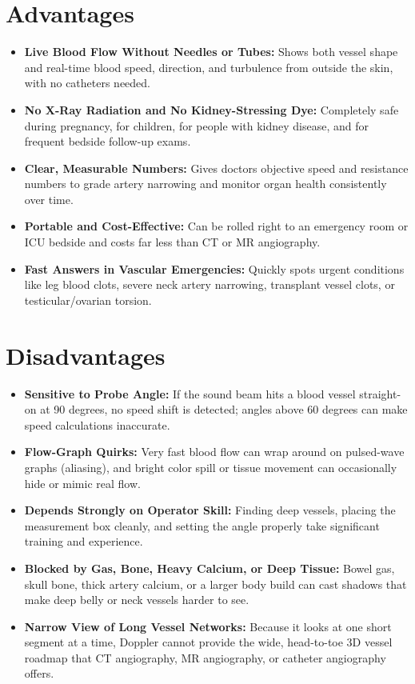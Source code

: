 \section{Advantages}
\begin{itemize}
\item \textbf{Live Blood Flow Without Needles or Tubes:} Shows both vessel shape and real-time blood speed, direction, and turbulence from outside the skin, with no catheters needed.
\item \textbf{No X-Ray Radiation and No Kidney-Stressing Dye:} Completely safe during pregnancy, for children, for people with kidney disease, and for frequent bedside follow-up exams.
\item \textbf{Clear, Measurable Numbers:} Gives doctors objective speed and resistance numbers to grade artery narrowing and monitor organ health consistently over time.
\item \textbf{Portable and Cost-Effective:} Can be rolled right to an emergency room or ICU bedside and costs far less than CT or MR angiography.
\item \textbf{Fast Answers in Vascular Emergencies:} Quickly spots urgent conditions like leg blood clots, severe neck artery narrowing, transplant vessel clots, or testicular/ovarian torsion.
\end{itemize}

\section{Disadvantages}
\begin{itemize}
\item \textbf{Sensitive to Probe Angle:} If the sound beam hits a blood vessel straight-on at 90 degrees, no speed shift is detected; angles above 60 degrees can make speed calculations inaccurate.
\item \textbf{Flow-Graph Quirks:} Very fast blood flow can wrap around on pulsed-wave graphs (aliasing), and bright color spill or tissue movement can occasionally hide or mimic real flow.
\item \textbf{Depends Strongly on Operator Skill:} Finding deep vessels, placing the measurement box cleanly, and setting the angle properly take significant training and experience.
\item \textbf{Blocked by Gas, Bone, Heavy Calcium, or Deep Tissue:} Bowel gas, skull bone, thick artery calcium, or a larger body build can cast shadows that make deep belly or neck vessels harder to see.
\item \textbf{Narrow View of Long Vessel Networks:} Because it looks at one short segment at a time, Doppler cannot provide the wide, head-to-toe 3D vessel roadmap that CT angiography, MR angiography, or catheter angiography offers.
\end{itemize}

